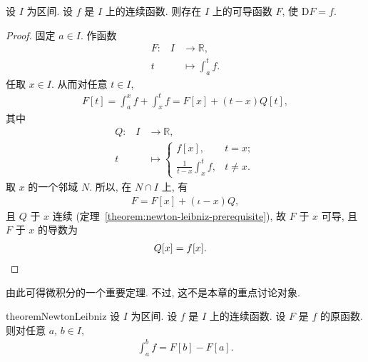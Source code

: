 \begin{theorem}
    设 $I$ 为区间. 设 $f$ 是 $I$ 上的连续函数. 则存在 $I$ 上的可导函数 $F$, 使 $\mathrm{D}F = f$.
\end{theorem}

\begin{proof}
    固定 $a \in I$. 作函数
    \begin{align*}
        \text{$F$:} \quad
        I & \to \mathbb{R},           \\
        t & \mapsto \int_{a}^{t} {f}.
    \end{align*}
    任取 $x \in I$. 从而对任意 $t \in I$,
    \begin{align*}
        F[t] = \int_{a}^{x} {f} + \int_{x}^{t} {f} = F[x] + (t - x) Q [t],
    \end{align*}
    其中
    \begin{align*}
        \text{$Q$:} \quad
        I & \to \mathbb{R},                                                       \\
        t & \mapsto \begin{cases}
                        f[x],                                             & t = x;    \\
                        {\displaystyle \frac{1}{t - x} \int_{x}^{t} {f}}, & t \neq x.
                    \end{cases}
    \end{align*}
    取 $x$ 的一个邻域 $N$. 所以, 在 $N \cap I$ 上, 有
    \begin{align*}
        F = F[x] + (\iota - x) Q,
    \end{align*}
    且 $Q$ 于 $x$ 连续 (定理~\ref{theorem:newton-leibniz-prerequisite}), 故 $F$ 于 $x$ 可导, 且 $F$ 于 $x$ 的导数为
    \begin{align*}
         & Q [x] = f[x]. \qedhere
    \end{align*}
\end{proof}

由此可得微积分的一个重要定理. 不过, 这不是本章的重点讨论对象.

\begin{restatable}{theorem}{NewtonLeibniz} \label{theorem:NewtonLeibniz}
    设 $I$ 为区间. 设 $f$ 是 $I$ 上的连续函数. 设 $F$ 是 $f$ 的原函数. 则对任意 $a$, $b \in I$,
    \begin{align*}
        \int_{a}^{b} {f} = F[b] - F[a].
    \end{align*}
\end{restatable}

